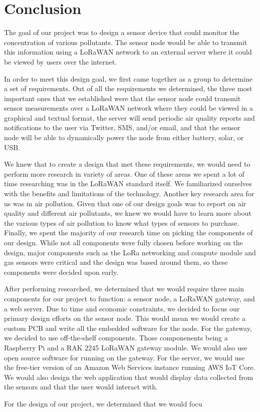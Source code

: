 \section{Conclusion}
The goal of our project was to design a sensor device that could monitor the concentration of various pollutants. The sensor node would be able to transmit this information using a LoRaWAN network to an external server where it could be viewed by users over the internet.

In order to meet this design goal, we first came together as a group to determine a set of requirements. Out of all the requirements we determined, the three most important ones that we established were that the sensor node could transmit sensor measurements over a LoRaWAN network where they could be viewed in a graphical and textual format, the server will send periodic air quality reports and notifications to the user via Twitter, SMS, and/or email, and that the sensor node will be able to dynamically power the node from either battery, solar, or USB. 

We knew that to create a design that met these requirements, we would need to perform more research in variety of areas. One of these areas we spent a lot of time researching was in the LoRaWAN standard itself. We familiarized ourselves with the benefits and limitations of the technology. Another key research area for us was in air pollution. Given that one of our design goals was to report on air quality and different air pollutants, we knew we would have to learn more about the various types of air pollution to know what types of sensors to purchase. Finally, we spent the majority of our research time on picking the components of our design. While not all components were fully chosen before working on the design, major components such as the LoRa networking and compute module and gas sensors were critical and the design was based around them, so these components were decided upon early.

After performing researched, we determined that we would require three main components for our project to function: a sensor node, a LoRaWAN gateway, and a web server. Due to time and economic constraints, we decided to focus our primary design efforts on the sensor node. This would mean we would create a custom PCB and write all the embedded software for the node. For the gateway, we decided to use off-the-shelf components. Those componenents being a Raspberry Pi and a RAK 2245 LoRaWAN gateway module. We would also use open source software for running on the gateway. For the server, we would use the free-tier version of an Amazon Web Services instance running AWS IoT Core. We would also design the web application that would display data collected from the sensors and that the user would interact with.

For the design of our project, we determined that we would focu
